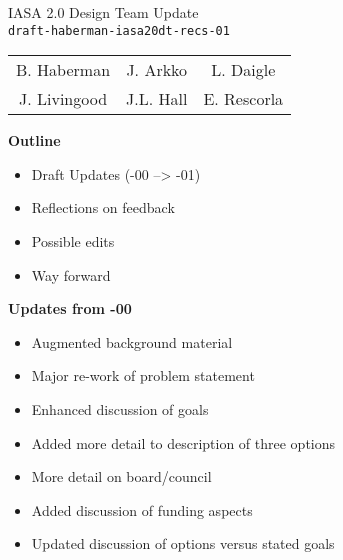 \documentclass[helvetica,landscape]{seminar}
\newcommand{\heading}[1]{%
  \begin{center} 
    \large\bf 
    #1 
  \end{center} 
  \vspace{.4 in}}
\begin{document}
\begin{slide}
\begin{center}
\vspace{.5 in}
\LARGE{{\bf}IASA 2.0 Design Team Update\\{\small \verb^draft-haberman-iasa20dt-recs-01^}}\\
\vspace{.2in}
\large{
\begin{tabular}{ c c c }
B. Haberman & J. Arkko & L. Daigle \\
J. Livingood & J.L. Hall & E. Rescorla 
\end{tabular}
}
\end{center}
\end{slide}

\centerslidesfalse 

\begin{slide}
\heading{Outline}

\begin{itemize}
\item Draft Updates (-00 --> -01)
\item Reflections on feedback
\item Possible edits
\item Way forward
\end{itemize}

\end{slide}

\begin{slide}

\heading{Updates from -00}

{\footnotesize
\begin{itemize}
\item Augmented background material
\item Major re-work of problem statement
\item Enhanced discussion of goals
\item Added more detail to description of three options
\item More detail on board/council
\item Added discussion of funding aspects
\item Updated discussion of options versus stated goals
\end{itemize}
}

\end{slide}
\end{document}
